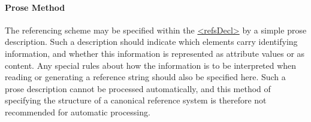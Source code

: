 \paragraph[{Prose Method}]{Prose Method}\label{HD54P}\par
The referencing scheme may be specified within the \hyperref[TEI.refsDecl]{<refsDecl>} by a simple prose description. Such a description should indicate which elements carry identifying information, and whether this information is represented as attribute values or as content. Any special rules about how the information is to be interpreted when reading or generating a reference string should also be specified here. Such a prose description cannot be processed automatically, and this method of specifying the structure of a canonical reference system is therefore not recommended for automatic processing.\par
